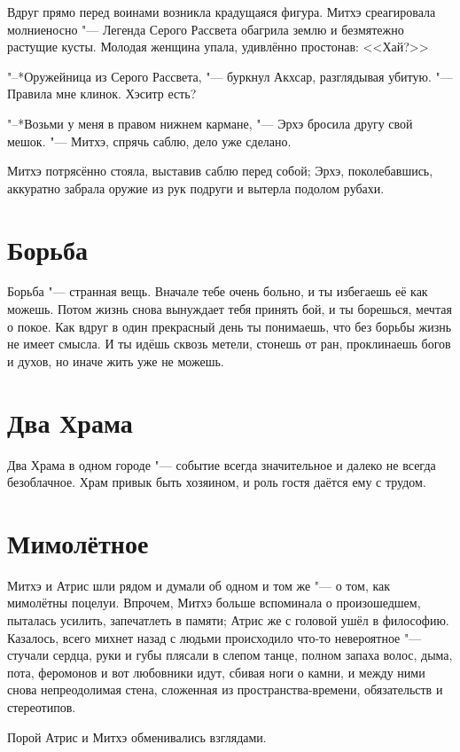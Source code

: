 \documentclass[a4paper,10pt]{book}
\newcommand{\ldotst}{\so{...}\xspace}
\begin{document}
Вдруг прямо перед воинами возникла крадущаяся фигура. Митхэ среагировала молниеносно "--- Легенда Серого Рассвета обагрила землю и безмятежно растущие кусты. Молодая женщина упала, удивлённо простонав: <<Хай?>>

"--*Оружейница из Серого Рассвета, "--- буркнул Акхсар, разглядывая убитую. "--- Правила мне клинок. Хэситр есть?

"--*Возьми у меня в правом нижнем кармане, "--- Эрхэ бросила другу свой мешок. "--- Митхэ, спрячь саблю, дело уже сделано.

Митхэ потрясённо стояла, выставив саблю перед собой; Эрхэ, поколебавшись, аккуратно забрала оружие из рук подруги и вытерла подолом рубахи.

\section{Борьба}

Борьба "--- странная вещь. Вначале тебе очень больно, и ты избегаешь её как можешь. Потом жизнь снова вынуждает тебя принять бой, и ты борешься, мечтая о покое. Как вдруг в один прекрасный день ты понимаешь, что без борьбы жизнь не имеет смысла. И ты идёшь сквозь метели, стонешь от ран, проклинаешь богов и духов, но иначе жить уже не можешь.

\section{Два Храма}

Два Храма в одном городе "--- событие всегда значительное и далеко не всегда безоблачное. Храм привык быть хозяином, и роль гостя даётся ему с трудом.

\section{Мимолётное}

Митхэ и Атрис шли рядом и думали об одном и том же "--- о том, как мимолётны поцелуи. Впрочем, Митхэ больше вспоминала о произошедшем, пыталась усилить, запечатлеть в памяти; Атрис же с головой ушёл в философию. Казалось, всего михнет назад с людьми происходило что-то невероятное "--- стучали сердца, руки и губы плясали в слепом танце, полном запаха волос, дыма, пота, феромонов\ldotst и вот любовники идут, сбивая ноги о камни, и между ними снова непреодолимая стена, сложенная из пространства-времени, обязательств и стереотипов.

Порой Атрис и Митхэ обменивались взглядами.
\end{document}
